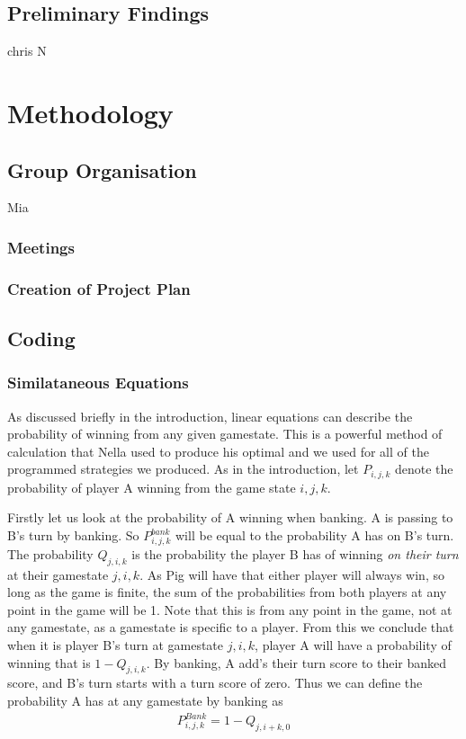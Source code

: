 \documentclass[a4paper,titlepage]{article}
\begin{document}
\subsection{Preliminary Findings}
chris N


\section{Methodology}
\subsection{Group Organisation}
Mia
\subsubsection{Meetings}
\subsubsection{Creation of Project Plan}

\subsection{Coding}
\subsubsection{Similataneous Equations}

As discussed briefly in the introduction, linear equations can describe the probability of winning from any given gamestate.
This is a powerful method of calculation that Nella used to produce his optimal and we used for all of the programmed strategies we produced.
As in the introduction, let $P_{i,j,k}$ denote the probability of player A winning
from the game state $i,j,k$.

Firstly let us look at the probability of A winning when banking.
A is passing to B's turn by banking. So $P^{bank}_{i,j,k}$ will be equal to the probability A has on B's turn.
The probability $Q_{j,i,k}$ is the probability the player B has of winning \textit{on their turn} at their gamestate $j,i,k$.
As Pig will have that either player will always win, so long as the game is finite, the sum of the probabilities from both players at any point in the game will be 1.
Note that this is from any point in the game, not at any gamestate, as a gamestate is specific to a player.
From this we conclude that when it is player B's turn at gamestate $j,i,k$, player A will have a probability of winning that is $1-Q_{j,i,k}$.
By banking, A add's their turn score to their banked score, and B's turn starts with a turn score of zero.
Thus we can define the probability A has at any gamestate by banking as
\begin{align*}
P^{Bank}_{i,j,k} = 1-Q_{j,i+k,0}
\end{align*}
\end{document}
